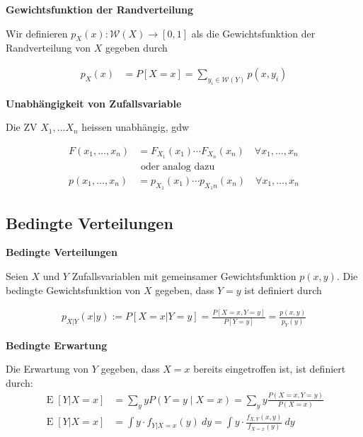 \documentclass[25pt]{sciposter}
\newcommand{\W}{\mathcal{W}}
\newcommand{\E}{\operatorname{E}}
\newenvironment{method}[1]{\begin{mdframed}[backgroundcolor=blue!10,innertopmargin=15pt, innerbottommargin=15pt,nobreak=true]
		\textbf{#1 }
	}
	{ 
	\end{mdframed}
}
\begin{document}
\begin{multicols}{3}
		\begin{method}{Gewichtsfunktion der Randverteilung}
			Wir definieren $p_X(x) : \W(X) \to [0,1]$ als die Gewichtsfunktion der Randverteilung von $X$ gegeben durch 
			
			\begin{align*}
				p_X(x) &= P[X=x] = \sum_{y_i\in \W(Y)} p(x,y_i)
			\end{align*}
			
		\end{method}
		
		
		\begin{method}{Unabhängigkeit von Zufallsvariable}
			Die ZV $X_1, \ldots X_n$ heissen unabhängig, gdw 
			
			\begin{align*}
				F(x_1, \ldots, x_n) &= F_{X_1}(x_1) \cdots F_{X_n}(x_n) \quad \forall x_1,\ldots,x_n\\
				&\text{ oder analog dazu}\\
				p(x_1,\ldots, x_n) &= p_{X_1}(x_1)\cdots p_{X_1n}(x_n) \quad \forall x_1,\ldots,x_n
			\end{align*}
			
			
			
			
		\end{method}
		
		
		
		\subsection*{Bedingte Verteilungen}
		
		\begin{method}{Bedingte Verteilungen}
			Seien $X$ und $Y$ Zufallsvariablen mit gemeinsamer Gewichtsfunktion $p(x,y)$. Die bedingte Gewichtsfunktion von $X$ gegeben, dass $Y = y$ ist definiert durch
			
			\begin{align*}
				p_{X|Y} (x|y) := P[X=x | Y=y] = \frac{P[X=x, Y=y]}{P[Y=y]} = \frac{p(x,y)}{p_Y(y)}
			\end{align*}
		\end{method}
		
		
		\begin{method}{Bedingte Erwartung}
			Die Erwartung von $Y$ gegeben, dass $X=x$ bereits eingetroffen ist, ist definiert durch:
			\begin{align*}
				\E[Y|X=x] &= \sum _{y}yP(Y=y\mid X=x)=\sum _{y}y{\frac {P(X=x,Y=y)}{P(X=x)}}\\
				\E[Y|X=x] &= \int y\cdot  f_{Y|X=x}(y)\  dy = \int y\cdot  \frac{f_{X,Y}(x,y)}{f_{X=x}(y)} \ dy
			\end{align*}
		\end{method}
		

\end{multicols}
\end{document}
